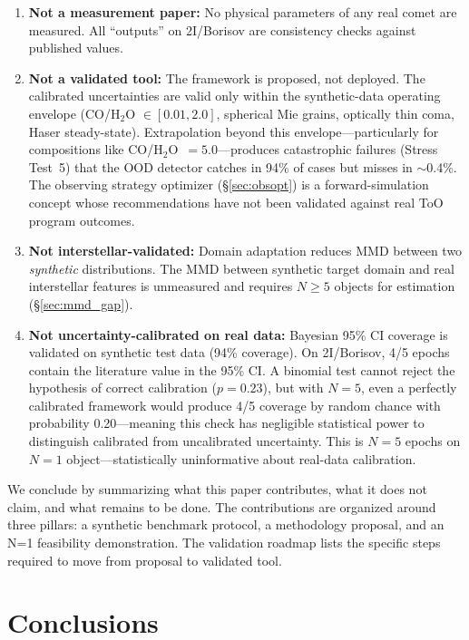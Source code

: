 \documentclass[usenatbib]{mnras}
\begin{document}
\begin{enumerate}
    \item \textbf{Not a measurement paper:} No physical parameters of any real comet are measured. All ``outputs'' on 2I/Borisov are consistency checks against published values.
    \item \textbf{Not a validated tool:} The framework is proposed, not deployed. The calibrated uncertainties are valid only within the synthetic-data operating envelope (CO/H$_2$O $\in [0.01, 2.0]$, spherical Mie grains, optically thin coma, Haser steady-state). Extrapolation beyond this envelope---particularly for compositions like CO/H$_2$O~$=5.0$---produces catastrophic failures (Stress Test~5) that the OOD detector catches in 94\% of cases but misses in $\sim$0.4\%. The observing strategy optimizer (\S\ref{sec:obsopt}) is a forward-simulation concept whose recommendations have not been validated against real ToO program outcomes.
    \item \textbf{Not interstellar-validated:} Domain adaptation reduces MMD between two \textit{synthetic} distributions. The MMD between synthetic target domain and real interstellar features is unmeasured and requires $N \geq 5$ objects for estimation (\S\ref{sec:mmd_gap}).
    \item \textbf{Not uncertainty-calibrated on real data:} Bayesian 95\% CI coverage is validated on synthetic test data (94\% coverage). On 2I/Borisov, 4/5 epochs contain the literature value in the 95\% CI. A binomial test cannot reject the hypothesis of correct calibration ($p=0.23$), but with $N=5$, even a perfectly calibrated framework would produce 4/5 coverage by random chance with probability 0.20---meaning this check has negligible statistical power to distinguish calibrated from uncalibrated uncertainty. This is $N=5$ epochs on $N=1$ object---statistically uninformative about real-data calibration.
\end{enumerate}

We conclude by summarizing what this paper contributes, what it does not claim, and what remains to be done. The contributions are organized around three pillars: a synthetic benchmark protocol, a methodology proposal, and an N=1 feasibility demonstration. The validation roadmap lists the specific steps required to move from proposal to validated tool.

\section{Conclusions}\label{sec:conclusions}
\end{document}
